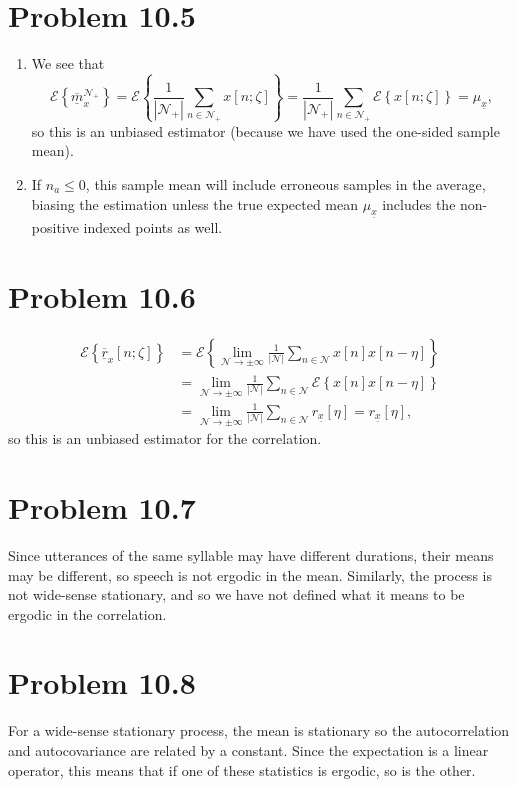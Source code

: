 \documentclass{article}
\begin{document}
\section*{Problem 10.5}
\begin{enumerate}
  \item{
    We see that
    $$
    \mathcal{E}\left\{\underline{\overline{m}}_x^{\mathcal{N}_+}\right\}
  = \mathcal{E}\left\{
      \frac{1}{|\mathcal{N}_+|}\sum_{n \in \mathcal{N}_+} x[n; \zeta]
    \right\}
  = \frac{1}{|\mathcal{N}_+|} \sum_{n \in \mathcal{N}_+} 
      \mathcal{E}\left\{x[n; \zeta]\right\} = \mu_{\underline{x}},
    $$
    so this is an unbiased estimator (because we have used the one-sided
    sample mean).
  }
  \item
  {
  If $n_a \leq 0$, this sample mean will include erroneous samples in the
  average, biasing the estimation unless the true expected mean
  $\mu_{\underline{x}}$ includes the non-positive indexed points as well.
  }
\end{enumerate}

\section*{Problem 10.6}
\begin{align*}
\mathcal{E}\left\{\underline{\overline{r}}_x[n;\zeta]\right\}
 &= \mathcal{E}\left\{\lim_{\mathcal{N} \to \pm \infty} 
  \frac{1}{|\mathcal{N}|}\sum_{n \in \mathcal{N}}
    x[n]x[n-\eta]\right\} \\
 &= \lim_{\mathcal{N} \to \pm \infty} \frac{1}{|\mathcal{N}|}
    \sum_{n \in \mathcal{N}} \mathcal{E}\left\{x[n]x[n-\eta]\right\} \\
 &= \lim_{\mathcal{N} \to \pm \infty} \frac{1}{|\mathcal{N}|}
    \sum_{n \in \mathcal{N}} r_{\underline{x}}[\eta] = 
    r_{\underline{x}}[\eta],
\end{align*}
so this is an unbiased estimator for the correlation. 

\section*{Problem 10.7}
Since utterances of the same syllable may have different durations,
their means may be different, so speech is not ergodic in the mean. 
Similarly, the process is not wide-sense stationary, and so we have not
defined what it means to be ergodic in the correlation.

\section*{Problem 10.8}
For a wide-sense stationary process, the mean is stationary so the 
autocorrelation and autocovariance are related by a constant. Since the
expectation is a linear operator, this means that if one of these statistics
is ergodic, so is the other.
\end{document}

